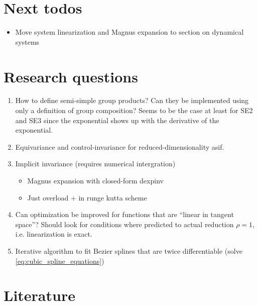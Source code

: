 

\section{Next todos}

\begin{itemize}
  \item Move system linearization and Magnus expansion to section on dynamical systems
\end{itemize}

\section{Research questions}

\begin{enumerate}
  \item How to define semi-simple group products? Can they be implemented using only a definition of group composition? Seems to be the case at least for SE2 and SE3 since the exponential shows up with the derivative of the exponential.
  \item Equivariance and control-invariance for reduced-dimensionality asif.
  \item Implicit invariance (requires numerical intergration)
  \begin{itemize}
      \item Magnus expansion with closed-form dexpinv
      \item Just overload + in runge kutta scheme
  \end{itemize}
  \item Can optimization be improved for functions that are ``linear in tangent space''? Should look for conditions where predicted to actual reduction $\rho = 1$, i.e. linearization is exact.
  \item Iterative algorithm to fit Bezier splines that are twice differentiable (solve \eqref{eq:cubic_spline_equations})
\end{enumerate}


\section{Literature}

